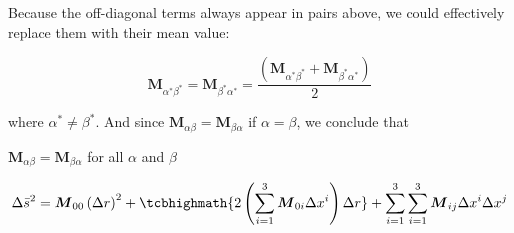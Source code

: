 Because the off-diagonal terms always appear in pairs above, we could effectively replace them with their mean value:

\[
    \boldsymbol{M}_{\alpha^*\beta^*} = \boldsymbol{M}_{\beta^*\alpha^*} = \frac{\left( \boldsymbol{M}_{\alpha^*\beta^*} + \boldsymbol{M}_{\beta^*\alpha^*}\right)}{2}
\]

where $\alpha^* \ne \beta^*$. And since $\boldsymbol{M}_{\alpha\beta} = \boldsymbol{M}_{\beta\alpha}$ if $\alpha = \beta$, we conclude that

\begin{tcolorbox}[colback=green!5!white, colframe=green!75!black]
    \begin{center}
        $\boldsymbol{M}_{\alpha\beta} = \boldsymbol{M}_{\beta\alpha}$ for all $\alpha$ and $\beta$
    \end{center}
\end{tcolorbox}

\begin{tcolorbox}[
    colback=green!5!white,
    colframe=green!75!black,
    colbacktitle=red!30!white,
    enhanced,
    attach boxed title to top center={yshift=-2mm},
    title={
        \parbox{10cm}{
            Why do we have the 2nd term in equation
        }
    }]

    \[
        \Delta\bar{s}^2 = \boldsymbol{M}_{00}\left(\Delta r\right)^2 + \tcbhighmath{2\left( \sum_{i = 1}^3\boldsymbol{M}_{0i}\Delta x^i \right)\Delta r} + \sum_{i = 1}^3\sum_{i = 1}^3 \boldsymbol{M}_{ij}\Delta x^i\Delta x^j
    \]
\end{tcolorbox}

